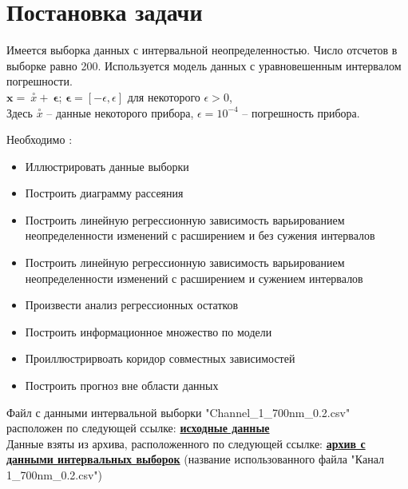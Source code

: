 \section{Постановка задачи}

Имеется выборка данных с интервальной неопределенностью. Число отсчетов в выборке равно 200. Используется модель данных с  уравновешенным интервалом погрешности. \\

$\bm{x} = \ \stackrel{\circ}{x} + \ \boldsymbol{\bm{\epsilon}}$; \quad $\boldsymbol{\bm{\epsilon}} = [-\epsilon, \epsilon]$  для некоторого $\epsilon >0 $, \\


Здесь $\stackrel{\circ}{x}$ -- данные некоторого прибора, $\epsilon = 10 ^ {-4}$ -- погрешность прибора.

Необходимо \cite{b:task}:
\begin{itemize}
	\item Иллюстрировать данные выборки
	\item Построить диаграмму рассеяния
	\item Построить линейную регрессионную зависимость варьированием неопределенности изменений с расширением и без сужения интервалов
	\item Построить линейную регрессионную зависимость варьированием неопределенности изменений с расширением и сужением интервалов
	\item Произвести анализ регрессионных остатков
	\item Построить информационное множество по модели
	\item Проиллюстрирвоать коридор совместных зависимостей
	\item Построить прогноз вне области данных
\end{itemize}

Файл с данными интервальной выборки "Channel\_1\_700nm\_0.2.csv" \quad расположен по следующей ссылке: \href{https://github.com/krzhld/mathstat/tree/lab4/lab4/source}{\textbf{исходные данные}} \\
Данные взяты из архива, расположенного по следующей ссылке: \href{https://github.com/AlexanderBazhenov/Solar-Data/blob/main/%D0%A1%D1%82%D0%B0%D1%82%D0%B8%D1%81%D1%82%D0%B8%D0%BA%D0%B0%20%D0%B8%D0%B7%D0%BC%D0%B5%D1%80%D0%B5%D0%BD%D0%B8%D0%B9.rar}{\textbf{архив с данными интервальных выборок}} (название использованного файла "Канал 1\_700nm\_0.2.csv")


\newpage
